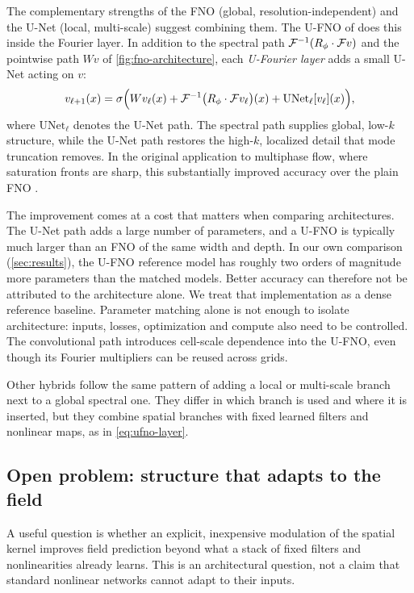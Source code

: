 The complementary strengths of the FNO (global, resolution-independent) and the U-Net (local, multi-scale) suggest combining them. The U-FNO of \citet{wen2022ufno} does this inside the Fourier layer. In addition to the spectral path $\mathcal{F}^{-1}(R_\phi\cdot\mathcal{F} v)$ and the pointwise path $W v$ of \cref{fig:fno-architecture}, each \emph{U-Fourier layer} adds a small U-Net acting on $v$:
\begin{equation}
  \label{eq:ufno-layer}
  v_{\ell+1}(x) = \sigma\Big( W v_\ell(x) + \mathcal{F}^{-1}\big(R_\phi\cdot\mathcal{F} v_\ell\big)(x) + \mathrm{UNet}_\ell[v_\ell](x) \Big),
\end{equation}
where $\mathrm{UNet}_\ell$ denotes the U-Net path. The spectral path supplies global, low-$k$ structure, while the U-Net path restores the high-$k$, localized detail that mode truncation removes. In the original application to multiphase flow, where saturation fronts are sharp, this substantially improved accuracy over the plain FNO \citep{wen2022ufno}.

The improvement comes at a cost that matters when comparing architectures. The U-Net path adds a large number of parameters, and a U-FNO is typically much larger than an FNO of the same width and depth. In our own comparison (\cref{sec:results}), the U-FNO reference model has roughly two orders of magnitude more parameters than the matched models. Better accuracy can therefore not be attributed to the architecture alone. We treat that implementation as a dense reference baseline. Parameter matching alone is not enough to isolate architecture: inputs, losses, optimization and compute also need to be controlled. The convolutional path introduces cell-scale dependence into the U-FNO, even though its Fourier multipliers can be reused across grids.

Other hybrids follow the same pattern of adding a local or multi-scale branch next to a global spectral one. They differ in which branch is used and where it is inserted, but they combine spatial branches with fixed learned filters and nonlinear maps, as in \cref{eq:ufno-layer}.

\subsection{Open problem: structure that adapts to the field}
\label{sec:adaptive-structure}

A useful question is whether an explicit, inexpensive modulation of the spatial kernel improves field prediction beyond what a stack of fixed filters and nonlinearities already learns. This is an architectural question, not a claim that standard nonlinear networks cannot adapt to their inputs.

